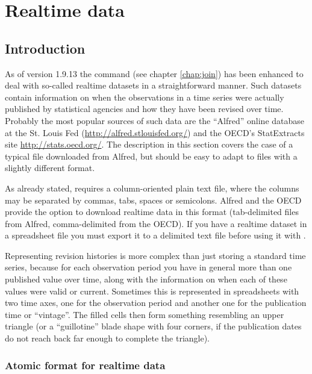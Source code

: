 \chapter{Realtime data}
\label{chap:realtime}

\section{Introduction}
\label{sec:realtime-intro}

As of  version 1.9.13 the  command (see chapter
\ref{chap:join}) has been enhanced to deal with so-called realtime
datasets in a straightforward manner.  Such datasets contain
information on when the observations in a time series were actually
published by statistical agencies and how they have been revised over
time. Probably the most popular sources of such data are the
``Alfred'' online database at the St. Louis Fed
(\url{http://alfred.stlouisfed.org/}) and the OECD's
\textsf{StatExtracts} site \url{http://stats.oecd.org/}.  The
description in this section covers the case of a typical file
downloaded from Alfred, but should be easy to adapt to files with a
slightly different format.

As already stated,  requires a column-oriented plain text
file, where the columns may be separated by commas, tabs, spaces or
semicolons. Alfred and the OECD provide the option to download
realtime data in this format (tab-delimited files from Alfred,
comma-delimited from the OECD). If you have a realtime dataset in a
spreadsheet file you must export it to a delimited text file before
using it with .

Representing revision histories is more complex than just storing a
standard time series, because for each observation period you have in
general more than one published value over time, along with the
information on when each of these values were valid or
current. Sometimes this is represented in spreadsheets with two time
axes, one for the observation period and another one for the
publication time or ``vintage''. The filled cells then form something
resembling an upper triangle (or a ``guillotine'' blade shape with
four corners, if the publication dates do not reach back far enough to
complete the triangle).

\subsection{Atomic format for realtime data}

